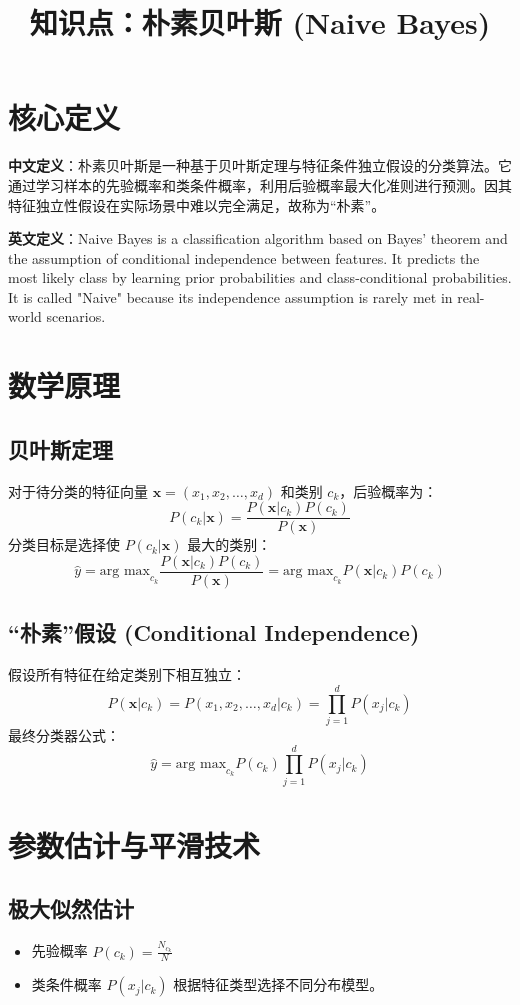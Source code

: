 \documentclass[12pt, a4paper]{article}
\title{知识点：朴素贝叶斯 (Naive Bayes)}
\author{}
\date{}
\begin{document}
\maketitle

\section{核心定义}
\textbf{中文定义}：朴素贝叶斯是一种基于贝叶斯定理与特征条件独立假设的分类算法。它通过学习样本的先验概率和类条件概率，利用后验概率最大化准则进行预测。因其特征独立性假设在实际场景中难以完全满足，故称为“朴素”。

\textbf{英文定义}：Naive Bayes is a classification algorithm based on Bayes' theorem and the assumption of conditional independence between features. It predicts the most likely class by learning prior probabilities and class-conditional probabilities. It is called "Naive" because its independence assumption is rarely met in real-world scenarios.

\section{数学原理}

\subsection{贝叶斯定理}
对于待分类的特征向量 $\mathbf{x} = (x_1, x_2, \dots, x_d)$ 和类别 $c_k$，后验概率为：
$$ P(c_k|\mathbf{x}) = \frac{P(\mathbf{x}|c_k) P(c_k)}{P(\mathbf{x})} $$
分类目标是选择使 $P(c_k|\mathbf{x})$ 最大的类别：
$$ \hat{y} = \text{arg max}_{c_k} \frac{P(\mathbf{x}|c_k) P(c_k)}{P(\mathbf{x})} = \text{arg max}_{c_k} P(\mathbf{x}|c_k) P(c_k) $$

\subsection{“朴素”假设 (Conditional Independence)}
假设所有特征在给定类别下相互独立：
$$ P(\mathbf{x}|c_k) = P(x_1, x_2, \dots, x_d | c_k) = \prod_{j=1}^d P(x_j|c_k) $$
最终分类器公式：
$$ \hat{y} = \text{arg max}_{c_k} P(c_k) \prod_{j=1}^d P(x_j|c_k) $$

\section{参数估计与平滑技术}

\subsection{极大似然估计}
\begin{itemize}
    \item 先验概率 $P(c_k) = \frac{N_{c_k}}{N}$
    \item 类条件概率 $P(x_j|c_k)$ 根据特征类型选择不同分布模型。
\end{itemize}
\end{document}
